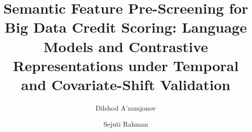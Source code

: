 \documentclass[final,5p,twocolumn]{elsarticle}
\begin{document}
\begin{frontmatter}

\title{Semantic Feature Pre-Screening for Big Data Credit Scoring: Language Models and Contrastive Representations under Temporal and Covariate-Shift Validation}

\author[aff1,aff3]{Dilshod A'zamjonov}

\author[aff2]{Sejuti Rahman}


\address[aff1]{Department of Engineering, New Uzbekistan University, 1 Movarounnahr Street, Mirzo Ulugbek District, Tashkent, Uzbekistan}
\address[aff2]{Department of Computing, New Uzbekistan University, 1 Movarounnahr Street, Mirzo Ulugbek District, Tashkent, Uzbekistan}
\address[aff3]{Central Bank of the Republic of Uzbekistan, 6 Islam Karimov Street, Tashkent 100001, Uzbekistan}


\end{frontmatter}
\end{document}
